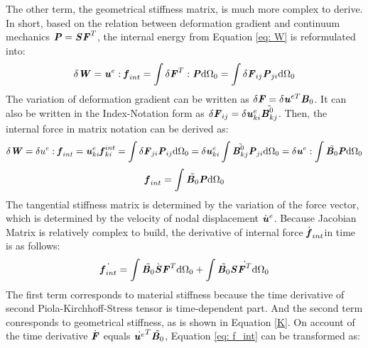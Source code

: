 The other term, the geometrical stiffness matrix, is much more complex to derive. In short, based on the relation between deformation gradient and continuum mechanics $\textbf{\textit{P}} = \textbf{\textit{S}}\textbf{\textit{F}}^T$, the internal energy from Equation \ref{eq: W} is reformulated into:  
\begin{equation}
\delta \textbf{\textit{W}} = \textbf{\textit{u}}^e : \textbf{\textit{f}}_{int} = \int \delta \textbf{\textit{F}}^T : \textbf{\textit{P}} \mathrm{d}\Omega_0 = \int \delta \textbf{\textit{F}}_{ij} \textbf{\textit{P}}_{ji} \mathrm{d}\Omega_0
\end{equation}
The variation of deformation gradient can be written as $\delta \textbf{\textit{F}} = \delta \textbf{\textit{u}}^{eT} \textbf{\textit{B}}_0$. It can also be written in the Index-Notation form as $\delta \textbf{\textit{F}}_{ij} = \delta \textbf{\textit{u}}_{ki}^e \tilde{\textbf{\textit{B}}_{kj}^0}$. Then, the internal force in matrix notation can be derived as:
\begin{equation}
\delta \textbf{\textit{W}} = \delta u^e : \textbf{\textit{f}}_{int} = \textbf{\textit{u}}_{ki}^e \textbf{\textit{f}}_{ki}^{int} = \int \delta \textbf{\textit{F}}_{ji} \textbf{\textit{P}}_{ij} \mathrm{d}\Omega_0 = \delta \textbf{\textit{u}}_{ki}^e \int \tilde{\textbf{\textit{B}}_{kj}^0} \textbf{\textit{P}}_{ji}\mathrm{d}\Omega_0 = \delta \textbf{\textit{u}}^e : \int \tilde{\textbf{\textit{B}}_0} \textbf{\textit{P}} \mathrm{d}\Omega_0
\end{equation}
\begin{equation}
\textbf{\textit{f}}_{int} = \int \tilde{\textbf{\textit{B}}_0} \textbf{\textit{P}} \mathrm{d}\Omega_0
\end{equation}
The tangential stiffness matrix is determined by the variation of the force vector, which is determined by the velocity of nodal displacement $\dot{\textbf{\textit{u}}}^e$. Because Jacobian Matrix is relatively complex to build, the derivative of internal force $\dot{\textbf{\textit{f}}}_{int}$in time is as follows:
\begin{equation} \label{eq: f_int}
\dot{\textbf{\textit{f}}_{int}} = \int \tilde{\textbf{\textit{B}}_0} \dot{\textbf{\textit{S}}} \textbf{\textit{F}}^T \mathrm{d}\Omega_0 + \int \tilde{\textbf{\textit{B}}_0} \textbf{\textit{S}} \dot{\textbf{\textit{F}}^T} \mathrm{d}\Omega_0
\end{equation}
The first term corresponds to material stiffness because the time derivative of second Piola-Kirchhoff-Stress tensor is time-dependent part. And the second term conresponds to geometrical stiffness, as is shown in Equation \ref{K}. On account of the time derivative $\dot {\textbf{\textit{F}}}$ equals $\dot{\textbf{\textit{u}}^e}^T \tilde{\textbf{\textit{B}}_0}$, Equation \ref{eq: f_int} can be transformed as:
